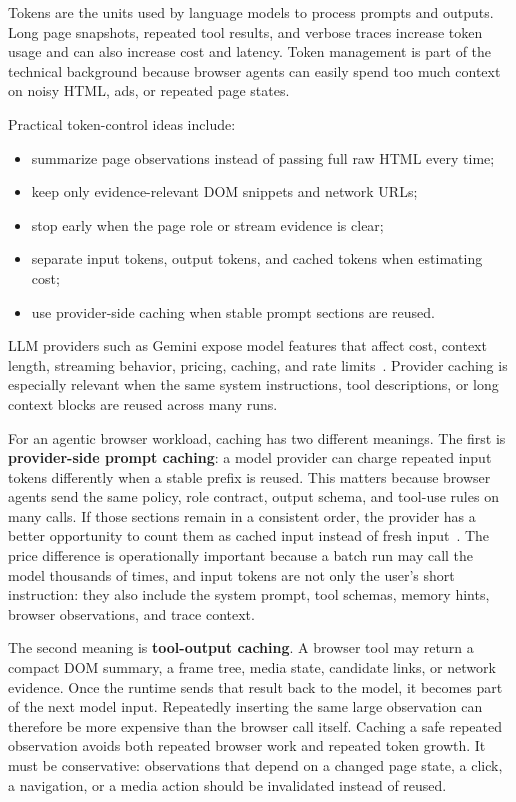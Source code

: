 Tokens are the units used by language models to process prompts and outputs. Long page
snapshots, repeated tool results, and verbose traces increase token usage and can also
increase cost and latency. Token management is part of the technical background because
browser agents can easily spend too much context on noisy HTML, ads, or repeated page
states.



Practical token-control ideas include:

\begin{itemize}
  \item summarize page observations instead of passing full raw HTML every time;
  \item keep only evidence-relevant DOM snippets and network URLs;
  \item stop early when the page role or stream evidence is clear;
  \item separate input tokens, output tokens, and cached tokens when estimating cost;
  \item use provider-side caching when stable prompt sections are reused.
\end{itemize}

LLM providers such as Gemini expose model features that affect cost, context length,
streaming behavior, pricing, caching, and rate limits~\cite{gemini-pricing,gemini-caching,gemini-rate-limits}.
Provider caching is especially relevant when the same system instructions, tool
descriptions, or long context blocks are reused across many runs.

For an agentic browser workload, caching has two different meanings. The first is
\textbf{provider-side prompt caching}: a model provider can charge repeated input
tokens differently when a stable prefix is reused. This matters because browser agents
send the same policy, role contract, output schema, and tool-use rules on many calls.
If those sections remain in a consistent order, the provider has a better opportunity
to count them as cached input instead of fresh input~\cite{gemini-caching}. The price
difference is operationally important because a batch run may call the model thousands
of times, and input tokens are not only the user's short instruction: they also include
the system prompt, tool schemas, memory hints, browser observations, and trace context.

The second meaning is \textbf{tool-output caching}. A browser tool may return a compact
DOM summary, a frame tree, media state, candidate links, or network evidence. Once the
runtime sends that result back to the model, it becomes part of the next model input.
Repeatedly inserting the same large observation can therefore be more expensive than the
browser call itself. Caching a safe repeated observation avoids both repeated browser
work and repeated token growth. It must be conservative: observations that depend on a
changed page state, a click, a navigation, or a media action should be invalidated
instead of reused.

